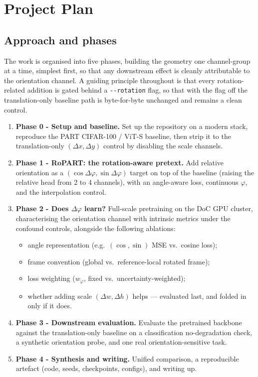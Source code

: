 \documentclass[11pt,a4paper]{report}
\begin{document}
\chapter{Project Plan}

\section{Approach and phases}
The work is organised into five phases, building the geometry one channel-group at a
time, simplest first, so that any downstream effect is cleanly attributable to the
orientation channel. A guiding principle throughout is that every rotation-related
addition is gated behind a \texttt{-{}-rotation} flag, so that with the flag off the
translation-only baseline path is byte-for-byte unchanged and remains a clean
control.

\begin{enumerate}
  \item \textbf{Phase 0 - Setup and baseline.} Set up the repository on a modern
  stack, reproduce the PART CIFAR-100 / ViT-S baseline, then strip it to the
  translation-only $(\Delta x, \Delta y)$ control by disabling the scale channels.

  \item \textbf{Phase 1 - RoPART: the rotation-aware pretext.} Add relative
  orientation as a $(\cos\Delta\varphi, \sin\Delta\varphi)$ target on top of the
  baseline (raising the relative head from 2 to 4 channels), with an angle-aware
  loss, continuous $\varphi$, and the interpolation control. 

  \item \textbf{Phase 2 - Does $\Delta\varphi$ learn?}
  Full-scale pretraining on the DoC GPU cluster, characterising the orientation
  channel with intrinsic metrics under the confound controls, alongside the
  following ablations:
  \begin{itemize}
    \item angle representation (e.g.\ $(\cos,\sin)$ MSE vs.\ cosine loss);
    \item frame convention (global vs.\ reference-local rotated frame);
    \item loss weighting ($w_\varphi$, fixed vs.\ uncertainty-weighted);
    \item whether adding scale $(\Delta w, \Delta h)$ helps --- evaluated last, and
    folded in only if it does.
  \end{itemize}

  \item \textbf{Phase 3 - Downstream evaluation.} Evaluate the pretrained backbone
  against the translation-only baseline on a classification no-degradation check, a
  synthetic orientation probe, and one real orientation-sensitive task.

  \item \textbf{Phase 4 - Synthesis and writing.} Unified comparison, a
  reproducible artefact (code, seeds, checkpoints, configs), and writing up.
\end{enumerate}
\end{document}
